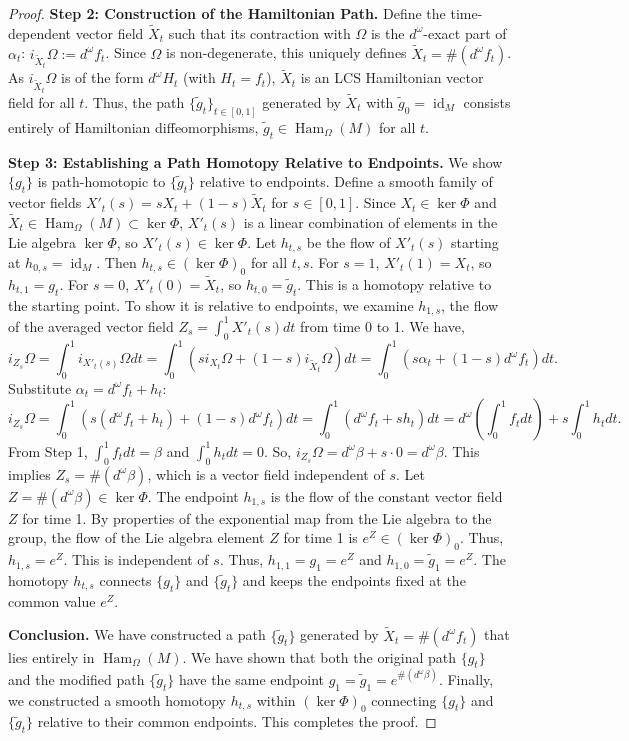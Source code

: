 \documentclass[11pt,a4paper]{amsart}
\theoremstyle{definition}
\theoremstyle{remark}
\newcommand{\Ham}{\operatorname{Ham}}
\newcommand{\id}{\operatorname{id}}
\begin{document}
\begin{proof}
		\textbf{Step 2: Construction of the Hamiltonian Path.} Define the time-dependent vector field $\tilde{X}_t$ such that its contraction with $\Omega$ is the $d^\omega$-exact part of $\alpha_t$: $i_{\tilde{X}_t}\Omega := d^\omega f_t$. Since $\Omega$ is non-degenerate, this uniquely defines $\tilde{X}_t = \#(d^\omega f_t)$. As $i_{\tilde{X}_t}\Omega$ is of the form $d^\omega H_t$ (with $H_t = f_t$), $\tilde{X}_t$ is an LCS Hamiltonian vector field for all $t$. Thus, the path $\{\tilde{g}_t\}_{t \in [0,1]}$ generated by $\tilde{X}_t$ with $\tilde{g}_0 = \id_M$ consists entirely of Hamiltonian diffeomorphisms, $\tilde{g}_t \in \Ham_\Omega(M)$ for all $t$.
		
		\textbf{Step 3: Establishing a Path Homotopy Relative to Endpoints.} We show $\{g_t\}$ is path-homotopic to $\{\tilde{g}_t\}$ relative to endpoints. Define a smooth family of vector fields $X'_t(s) = sX_t + (1-s)\tilde{X}_t$ for $s \in [0,1]$. Since $X_t \in \ker \Phi$ and $\tilde{X}_t \in \Ham_\Omega(M) \subset \ker \Phi$, $X'_t(s)$ is a linear combination of elements in the Lie algebra $\ker \Phi$, so $X'_t(s) \in \ker \Phi$. Let $h_{t,s}$ be the flow of $X'_t(s)$ starting at $h_{0,s} = \id_M$. Then $h_{t,s} \in (\ker \Phi)_0$ for all $t, s$. For $s=1$, $X'_t(1) = X_t$, so $h_{t,1} = g_t$. For $s=0$, $X'_t(0) = \tilde{X}_t$, so $h_{t,0} = \tilde{g}_t$. This is a homotopy relative to the starting point. To show it is relative to endpoints, we examine $h_{1,s}$, the flow of the averaged vector field $Z_s = \int_0^1 X'_t(s)dt$ from time 0 to 1. We have,
		\[
		i_{Z_s}\Omega = \int_0^1 i_{X'_t(s)}\Omega dt = \int_0^1 (s i_{X_t}\Omega + (1-s) i_{\tilde{X}_t}\Omega) dt = \int_0^1 (s\alpha_t + (1-s)d^\omega f_t) dt.
		\]
		Substitute $\alpha_t = d^\omega f_t + h_t$:
		\[
		i_{Z_s}\Omega = \int_0^1 (s(d^\omega f_t + h_t) + (1-s)d^\omega f_t) dt = \int_0^1 (d^\omega f_t + s h_t) dt = d^\omega \left(\int_0^1 f_t dt\right) + s \int_0^1 h_t dt.
		\]
		From Step 1, $\int_0^1 f_t dt = \beta$ and $\int_0^1 h_t dt = 0$. So, $i_{Z_s}\Omega = d^\omega \beta + s \cdot 0 = d^\omega \beta$. This implies $Z_s = \#(d^\omega \beta)$, which is a vector field independent of $s$. Let $Z = \#(d^\omega \beta) \in \ker \Phi$. The endpoint $h_{1,s}$ is the flow of the constant vector field $Z$ for time 1. By properties of the exponential map from the Lie algebra to the group, the flow of the Lie algebra element $Z$ for time 1 is $e^Z \in (\ker \Phi)_0$. Thus, $h_{1,s} = e^Z$. This is independent of $s$. Thus, $h_{1,1} = g_1 = e^Z$ and $h_{1,0} = \tilde{g}_1 = e^Z$. The homotopy $h_{t,s}$ connects $\{g_t\}$ and $\{\tilde{g}_t\}$ and keeps the endpoints fixed at the common value $e^Z$.
		
		\textbf{Conclusion.} We have constructed a path $\{\tilde{g}_t\}$ generated by $\tilde{X}_t = \#(d^\omega f_t)$ that lies entirely in $\Ham_\Omega(M)$. We have shown that both the original path $\{g_t\}$ and the modified path $\{\tilde{g}_t\}$ have the same endpoint $g_1 = \tilde{g}_1 = e^{\#(d^\omega \beta)}$. Finally, we constructed a smooth homotopy $h_{t,s}$ within $(\ker \Phi)_0$ connecting $\{g_t\}$ and $\{\tilde{g}_t\}$ relative to their common endpoints. This completes the proof.
	\end{proof}
	
\end{document}
